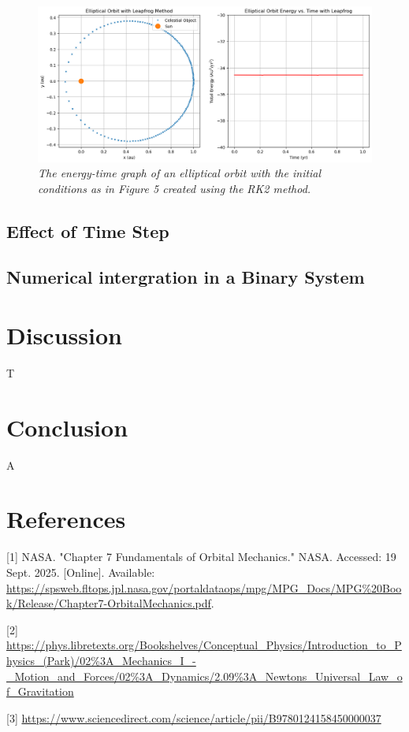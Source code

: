 \documentclass[12 pt, a4paper]{article}
\begin{document}
\begin{figure}[H]
  \includegraphics[width=0.7\linewidth]{leapfrogelliptic.png}
  \centering
  \caption{\textit{The energy-time graph of an elliptical orbit with the initial conditions as in Figure 5 created using the RK2 method.}}
\end{figure}

\subsection{Effect of Time Step}

\subsection{Numerical intergration in a Binary System}


\section{Discussion}
T

\section{Conclusion}
A

\newpage
\section{References}  

[1] NASA. "Chapter 7 Fundamentals of Orbital Mechanics." NASA. Accessed: 19 Sept. 2025. [Online]. Available: \url{https://spsweb.fltops.jpl.nasa.gov/portaldataops/mpg/MPG_Docs/MPG%20Book/Release/Chapter7-OrbitalMechanics.pdf}.

[2] \url{https://phys.libretexts.org/Bookshelves/Conceptual_Physics/Introduction_to_Physics_(Park)/02%3A_Mechanics_I_-_Motion_and_Forces/02%3A_Dynamics/2.09%3A_Newtons_Universal_Law_of_Gravitation}

[3] \url{https://www.sciencedirect.com/science/article/pii/B9780124158450000037}
\end{document}
